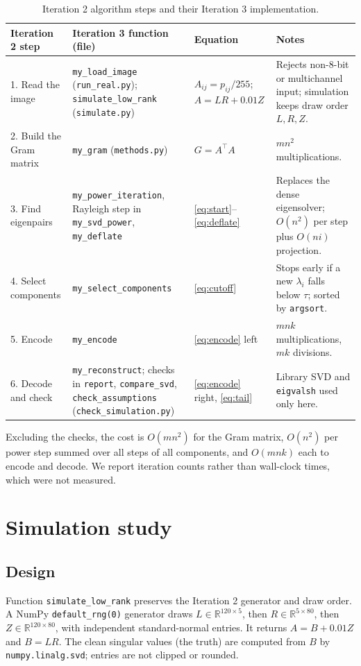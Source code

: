 \documentclass[11pt,letterpaper]{article}
\numberwithin{equation}{section}
\newcommand{\R}{\mathbb{R}}
\newcommand{\fn}[1]{\texttt{#1}}
\begin{document}
\begin{table}[H]
\centering\small
\caption{Iteration 2 algorithm steps and their Iteration 3 implementation.}
\label{tab:map}
\begin{tabularx}{\linewidth}{@{}P{2.5cm} P{4.4cm} P{2.3cm} L@{}}\toprule
Iteration 2 step & Iteration 3 function (file) & Equation & Notes\\. Read the image & \fn{my\_load\_image} (\fn{run\_real.py}); \fn{simulate\_low\_rank} (\fn{simulate.py}) & $A_{ij}=p_{ij}/255$; $A=LR+0.01Z$ & Rejects non-8-bit or multichannel input; simulation keeps draw order $L,R,Z$.\\
2. Build the Gram matrix & \fn{my\_gram} (\fn{methods.py}) & $G=A^\top A$ & $mn^2$ multiplications.\\
3. Find eigenpairs & \fn{my\_power\_iteration}, Rayleigh step in \fn{my\_svd\_power}, \fn{my\_deflate} & \eqref{eq:start}--\eqref{eq:deflate} & Replaces the dense eigensolver; $O(n^2)$ per step plus $O(ni)$ projection.\\
4. Select components & \fn{my\_select\_components} & \eqref{eq:cutoff} & Stops early if a new $\lambda_i$ falls below $\tau$; sorted by \fn{argsort}.\\
5. Encode & \fn{my\_encode} & \eqref{eq:encode} left & $mnk$ multiplications, $mk$ divisions.\\
6. Decode and check & \fn{my\_reconstruct}; checks in \fn{report}, \fn{compare\_svd}, \fn{check\_assumptions} (\fn{check\_simulation.py}) & \eqref{eq:encode} right, \eqref{eq:tail} & Library SVD and \fn{eigvalsh} used only here.\\\bottomrule
\end{tabularx}
\end{table}

Excluding the checks, the cost is $O(mn^2)$ for the Gram matrix, $O(n^2)$ per power step summed over all steps of all components, and $O(mnk)$ each to encode and decode. We report iteration counts rather than wall-clock times, which were not measured.

\section{Simulation study}\label{sec:sim}

\subsection{Design}
Function \fn{simulate\_low\_rank} preserves the Iteration 2 generator and draw order. A NumPy \fn{default\_rng(0)} generator draws $L\in\R^{120\times5}$, then $R\in\R^{5\times80}$, then $Z\in\R^{120\times80}$, with independent standard-normal entries. It returns $A=B+0.01Z$ and $B=LR$. The clean singular values (the truth) are computed from $B$ by \fn{numpy.linalg.svd}; entries are not clipped or rounded.
\end{document}
